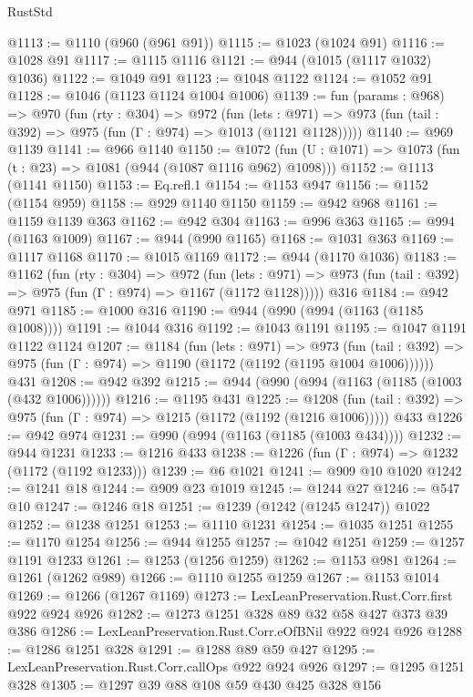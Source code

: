 \begin{lexlean}{RustStd}
\begin{coremodule}
{\begin{coremodule}
{{{{{{{{{{@1113 := @1110 (@960 (@961 @91))
@1115 := @1023 (@1024 @91)
@1116 := @1028 @91
@1117 := @1115 @1116
@1121 := @944 (@1015 (@1117 @1032) @1036)
@1122 := @1049 @91
@1123 := @1048 @1122
@1124 := @1052 @91
@1128 := @1046 (@1123 @1124 @1004 @1006)
@1139 := fun (params : @968) =>
  @970
    (fun (rty : @304) =>
    @972
      (fun (lets : @971) =>
      @973 (fun (tail : @392) => @975 (fun (Γ : @974) => @1013 (@1121 @1128)))))
@1140 := @969 @1139
@1141 := @966 @1140
@1150 := @1072 (fun (U : @1071) => @1073 (fun (t : @23) => @1081 (@944 (@1087 @1116 @962) @1098)))
@1152 := @1113 (@1141 @1150)
@1153 := Eq.refl.{1}
@1154 := @1153 @947
@1156 := @1152 (@1154 @959)
@1158 := @929 @1140 @1150
@1159 := @942 @968
@1161 := @1159 @1139 @363
@1162 := @942 @304
@1163 := @996 @363
@1165 := @994 (@1163 @1009)
@1167 := @944 (@990 @1165)
@1168 := @1031 @363
@1169 := @1117 @1168
@1170 := @1015 @1169
@1172 := @944 (@1170 @1036)
@1183 := @1162
    (fun (rty : @304) =>
    @972
      (fun (lets : @971) =>
      @973 (fun (tail : @392) => @975 (fun (Γ : @974) => @1167 (@1172 @1128)))))
    @316
@1184 := @942 @971
@1185 := @1000 @316
@1190 := @944 (@990 (@994 (@1163 (@1185 @1008))))
@1191 := @1044 @316
@1192 := @1043 @1191
@1195 := @1047 @1191 @1122 @1124
@1207 := @1184
    (fun (lets : @971) =>
    @973 (fun (tail : @392) => @975 (fun (Γ : @974) => @1190 (@1172 (@1192 (@1195 @1004 @1006))))))
    @431
@1208 := @942 @392
@1215 := @944 (@990 (@994 (@1163 (@1185 (@1003 (@432 @1006))))))
@1216 := @1195 @431
@1225 := @1208
    (fun (tail : @392) => @975 (fun (Γ : @974) => @1215 (@1172 (@1192 (@1216 @1006)))))
    @433
@1226 := @942 @974
@1231 := @990 (@994 (@1163 (@1185 (@1003 @434))))
@1232 := @944 @1231
@1233 := @1216 @433
@1238 := @1226 (fun (Γ : @974) => @1232 (@1172 (@1192 @1233)))
@1239 := @6 @1021
@1241 := @909 @10 @1020
@1242 := @1241 @18
@1244 := @909 @23 @1019
@1245 := @1244 @27
@1246 := @547 @10
@1247 := @1246 @18
@1251 := @1239 (@1242 (@1245 @1247)) @1022
@1252 := @1238 @1251
@1253 := @1110 @1231
@1254 := @1035 @1251
@1255 := @1170 @1254
@1256 := @944 @1255
@1257 := @1042 @1251
@1259 := @1257 @1191 @1233
@1261 := @1253 (@1256 @1259)
@1262 := @1153 @981
@1264 := @1261 (@1262 @989)
@1266 := @1110 @1255 @1259
@1267 := @1153 @1014
@1269 := @1266 (@1267 @1169)
@1273 := LexLeanPreservation.Rust.Corr.first @922 @924 @926
@1282 := @1273 @1251 @328 @89 @32 @58 @427 @373 @39 @386
@1286 := LexLeanPreservation.Rust.Corr.eOfBNil @922 @924 @926
@1288 := @1286 @1251 @328
@1291 := @1288 @89 @59 @427
@1295 := LexLeanPreservation.Rust.Corr.callOps @922 @924 @926
@1297 := @1295 @1251 @328
@1305 := @1297 @39 @88 @108 @59 @430 @425 @328 @156
}}}}}}}}}}
\end{coremodule}}
\end{coremodule}
\end{lexlean}
